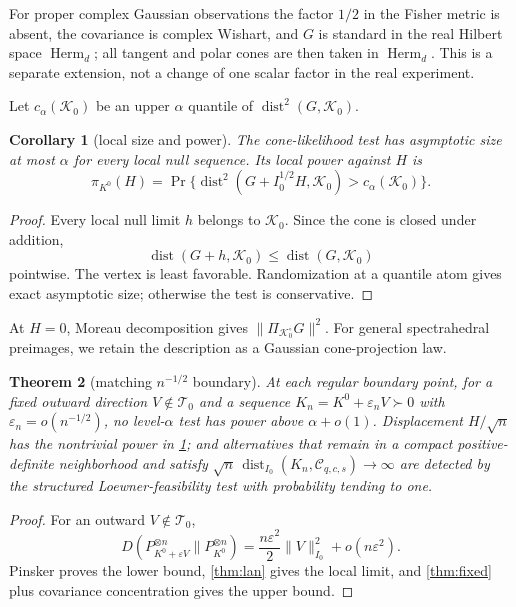 \documentclass[11pt]{article}
\newtheorem{theorem}{Theorem}[section]
\newtheorem{corollary}[theorem]{Corollary}
\newcommand{\Herm}{\operatorname{Herm}}
\newcommand{\dist}{\operatorname{dist}}
\newcommand{\cC}{\mathcal C}
\newcommand{\cT}{\mathcal T}
\newcommand{\norm}[1]{\lVert #1\rVert}
\begin{document}
For proper complex Gaussian observations the factor $1/2$ in the Fisher
metric is absent, the covariance is complex Wishart, and $G$ is standard in
the real Hilbert space $\Herm_d$; all tangent and polar cones are then taken
in $\Herm_d$.  This is a separate extension, not a change of one scalar factor
in the real experiment.

Let $c_\alpha(\mathcal K_0)$ be an upper $\alpha$ quantile of
$\dist^2(G,\mathcal K_0)$.

\begin{corollary}[local size and power]\label{cor:local}
The cone-likelihood test has asymptotic size at most $\alpha$ for every local
null sequence.  Its local power against $H$ is
\[
\pi_{K^0}(H)=
\Pr\{\dist^2(G+I_0^{1/2}H,\mathcal K_0)>c_\alpha(\mathcal K_0)\}.  \tag{8.7}\label{eq:localpower}
\]
\end{corollary}

\begin{proof}
Every local null limit $h$ belongs to $\mathcal K_0$.  Since the cone is
closed under addition,
\[
\dist(G+h,\mathcal K_0)\le\dist(G,\mathcal K_0)                   \tag{8.8}
\]
pointwise.  The vertex is least favorable.  Randomization at a quantile atom
gives exact asymptotic size; otherwise the test is conservative.
\end{proof}

At $H=0$, Moreau decomposition gives
$\norm{\Pi_{\mathcal K_0^\circ}G}^2$.  For general spectrahedral preimages,
we retain the description as a Gaussian cone-projection law.

\begin{theorem}[matching $n^{-1/2}$ boundary]\label{thm:minimax}
At each regular boundary point, for a fixed outward direction
$V\notin\cT_0$ and a sequence $K_n=K^0+\varepsilon_nV\succ0$ with
$\varepsilon_n=o(n^{-1/2})$, no level-$\alpha$ test has power above
$\alpha+o(1)$.  Displacement
$H/\sqrt n$ has the nontrivial power in \cref{cor:local}; and alternatives
that remain in a compact positive-definite neighborhood and satisfy
$\sqrt n\,\dist_{I_0}(K_n,\cC_{q,c,s})\to\infty$ are detected by the
structured Loewner-feasibility test with probability tending to one.
\end{theorem}

\begin{proof}
For an outward $V\notin\cT_0$,
\[
D(P_{K^0+\varepsilon V}^{\otimes n}\|P_{K^0}^{\otimes n})
=\frac{n\varepsilon^2}{2}\norm{V}_{I_0}^2+o(n\varepsilon^2).       \tag{8.9}
\]
Pinsker proves the lower bound, \cref{thm:lan} gives the local limit, and
\cref{thm:fixed} plus covariance concentration gives the upper bound.
\end{proof}
\end{document}
